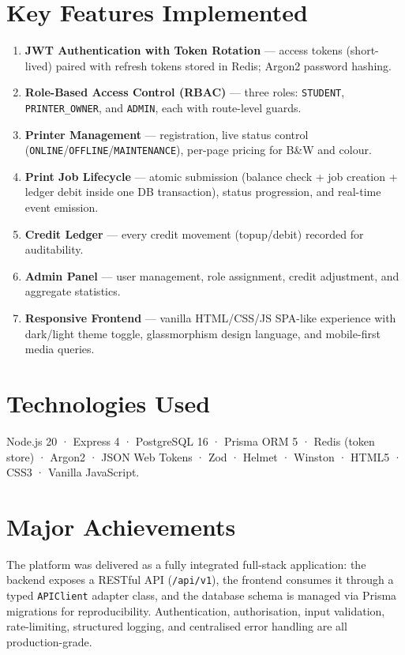 \documentclass[12pt,a4paper]{report}
\begin{document}
\section*{Key Features Implemented}
\begin{enumerate}[leftmargin=2em]
  \item \textbf{JWT Authentication with Token Rotation} — access tokens (short-lived) paired
    with refresh tokens stored in Redis; Argon2 password hashing.
  \item \textbf{Role-Based Access Control (RBAC)} — three roles: \texttt{STUDENT},
    \texttt{PRINTER\_OWNER}, and \texttt{ADMIN}, each with route-level guards.
  \item \textbf{Printer Management} — registration, live status control
    (\texttt{ONLINE}/\texttt{OFFLINE}/\texttt{MAINTENANCE}), per-page pricing for B\&W and
    colour.
  \item \textbf{Print Job Lifecycle} — atomic submission (balance check + job creation +
    ledger debit inside one DB transaction), status progression, and real-time event
    emission.
  \item \textbf{Credit Ledger} — every credit movement (topup/debit) recorded for
    auditability.
  \item \textbf{Admin Panel} — user management, role assignment, credit adjustment, and
    aggregate statistics.
  \item \textbf{Responsive Frontend} — vanilla HTML/CSS/JS SPA-like experience with dark/light
    theme toggle, glassmorphism design language, and mobile-first media queries.
\end{enumerate}

\section*{Technologies Used}
Node.js 20 · Express 4 · PostgreSQL 16 · Prisma ORM 5 · Redis (token store) · Argon2 ·
JSON Web Tokens · Zod · Helmet · Winston · HTML5 · CSS3 · Vanilla JavaScript.

\section*{Major Achievements}
The platform was delivered as a fully integrated full-stack application: the backend exposes a
RESTful API (\texttt{/api/v1}), the frontend consumes it through a typed \texttt{APIClient}
adapter class, and the database schema is managed via Prisma migrations for reproducibility.
Authentication, authorisation, input validation, rate-limiting, structured logging, and
centralised error handling are all production-grade.
\end{document}
